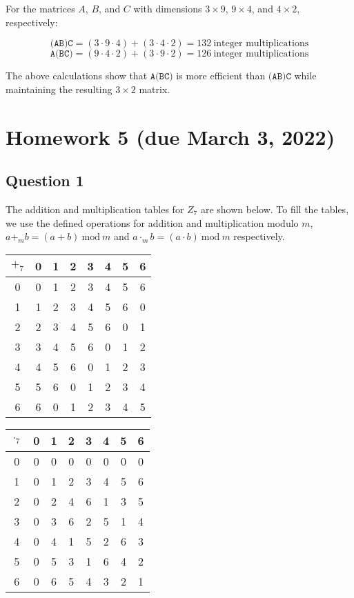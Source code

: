 \documentclass[letterpaper, 12pt]{article}
\newcommand{\Mod}[1]{\ \mathrm{mod}\ #1}
\begin{document}
For the matrices $A$, $B$, and $C$ with dimensions $3 \times 9$, $9 \times 4$, and $4 \times 2$, respectively:

\[\texttt{(AB)C} = (3 \cdot 9 \cdot 4) + (3 \cdot 4 \cdot 2) = 132 \ \text{integer multiplications}\]
\[\texttt{A(BC)} = (9 \cdot 4 \cdot 2) + (3 \cdot 9 \cdot 2) = 126 \ \text{integer multiplications}\]

The above calculations show that $\texttt{A(BC)}$ is more efficient than $\texttt{(AB)C}$ while maintaining the resulting $3 \times 2$ matrix.

\section*{Homework 5 (due March 3, 2022)}

\subsection*{Question 1}
The addition and multiplication tables for $Z_7$ are shown below. To fill the tables, we use the defined operations for addition and multiplication modulo $m$, $a +_m b = (a+b) \Mod{m}$ and $a \cdot_m b = (a \cdot b) \Mod{m}$ respectively.
\setlength{\tabcolsep}{6pt}
\begin{multicols}{2}
    \begin{table}[H]
        \begin{tabular}{c|c c c c c c c}
             $+_7$ & 0 & 1 & 2 & 3 & 4 & 5 & 6\\
             \hline
             0 & 0 & 1 & 2 & 3 & 4 & 5 & 6\\
             1 & 1 & 2 & 3 & 4 & 5 & 6 & 0\\
             2 & 2 & 3 & 4 & 5 & 6 & 0 & 1\\
             3 & 3 & 4 & 5 & 6 & 0 & 1 & 2\\
             4 & 4 & 5 & 6 & 0 & 1 & 2 & 3\\
             5 & 5 & 6 & 0 & 1 & 2 & 3 & 4\\
             6 & 6 & 0 & 1 & 2 & 3 & 4 & 5
        \end{tabular}
    \end{table}
    
    \begin{table}[H]
        \begin{tabular}{c|c c c c c c c}
             $\cdot_7$ & 0 & 1 & 2 & 3 & 4 & 5 & 6\\
             \hline
             0 & 0 & 0 & 0 & 0 & 0 & 0 & 0\\
             1 & 0 & 1 & 2 & 3 & 4 & 5 & 6\\
             2 & 0 & 2 & 4 & 6 & 1 & 3 & 5\\
             3 & 0 & 3 & 6 & 2 & 5 & 1 & 4\\
             4 & 0 & 4 & 1 & 5 & 2 & 6 & 3\\
             5 & 0 & 5 & 3 & 1 & 6 & 4 & 2\\
             6 & 0 & 6 & 5 & 4 & 3 & 2 & 1
        \end{tabular}
    \end{table}
\end{multicols}
\end{document}
